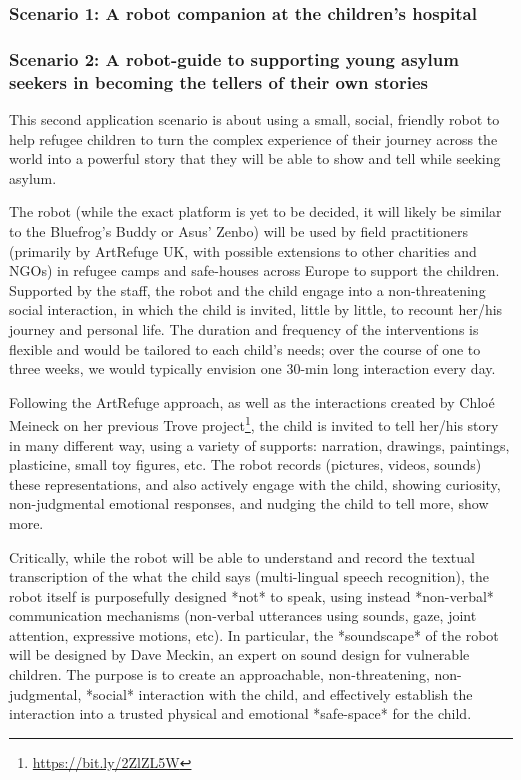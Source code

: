 \documentclass[11pt]{article}
\begin{document}
\subsubsection{Scenario 1: A robot companion at the children's hospital}

\subsubsection{Scenario 2: A robot-guide to supporting young asylum seekers in
becoming the tellers of their own stories}

This second application scenario is about using a small, social, friendly robot
to help refugee children to turn the complex experience of their journey across
the world into a powerful story that they will be able to show and tell while
seeking asylum.

The robot (while the exact platform is yet to be decided, it will likely be
similar to the Bluefrog's Buddy or Asus' Zenbo) will be used by field
practitioners (primarily by ArtRefuge UK, with possible extensions to other
charities and NGOs) in refugee camps and safe-houses across Europe to support
the children. Supported by the staff, the robot and the child engage into a
non-threatening social interaction, in which the child is invited, little by
little, to recount her/his journey and personal life. The duration and frequency
of the interventions is flexible and would be tailored to each child's needs;
over the course of one to three weeks, we would typically envision one 30-min
long interaction every day.

Following the ArtRefuge approach, as well as the interactions created by Chloé
Meineck on her previous Trove project\footnote{\url{https://bit.ly/2ZlZL5W}},
the child is invited to tell her/his story in many different way, using a
variety of supports: narration, drawings, paintings, plasticine, small toy
figures, etc.  The robot records (pictures, videos, sounds) these
representations, and also actively engage with the child, showing curiosity,
non-judgmental emotional responses, and nudging the child to tell more, show
more.

Critically, while the robot will be able to understand and record the textual
transcription of the what the child says (multi-lingual speech recognition),
the robot itself is purposefully designed *not* to speak, using instead *non-verbal*
communication mechanisms (non-verbal utterances using sounds, gaze, joint
attention, expressive motions, etc). In particular, the *soundscape* of the
robot will be designed by Dave Meckin, an expert on sound design for vulnerable
children. The purpose is to create an approachable, non-threatening,
non-judgmental, *social* interaction with the child, and effectively establish
the interaction into a trusted physical and emotional *safe-space* for the
child.
\end{document}
